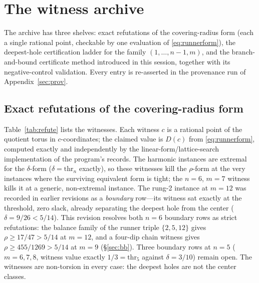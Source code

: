 
\section{The witness archive}\label{sec:witness}

The archive has three shelves: exact refutations of the covering-radius
form (each a single rational point, checkable by one evaluation of
\eqref{eq:runnerform}), the deepest-hole certification ladder for the
family $(1,\dots,n{-}1,m)$, and the branch-and-bound certificate method
introduced in this session, together with its negative-control
validation. Every entry is re-asserted in the provenance run of
Appendix~\ref{sec:prov}.

\subsection{Exact refutations of the covering-radius form}

Table~\ref{tab:refute} lists the witnesses. Each witness $c$ is a
rational point of the quotient torus in $c$-coordinates; the claimed
value is $D(c)$ from \eqref{eq:runnerform}, computed exactly and
independently by the linear-form/lattice-search implementation of the
program's records. The harmonic instances are extremal for the
$\delta$-form ($\delta=\mathrm{thr}_n$ exactly), so these witnesses kill
the $\rho$-form at the very instances where the surviving equivalent form
is tight; the $n=6$, $m=7$ witness kills it at a generic, non-extremal
instance. The rung-2 instance at $m=12$ was recorded in earlier revisions as a
\emph{boundary} row---its witness sat exactly at the threshold, zero
slack, already separating the deepest hole from the center
($\delta=9/26<5/14$). This revision resolves both $n=6$ boundary rows
as strict refutations: the balance family of the runner triple
$\{2,5,12\}$ gives $\rho\ge17/47>5/14$ at $m=12$, and a four-dip
chain witness gives $\rho\ge455/1269>5/14$ at $m=9$
(\S\ref{sec:bb}). Three boundary rows at $n=5$ ($m=6,7,8$, witness
value exactly $1/3=\mathrm{thr}_5$ against $\delta=3/10$) remain open.
The witnesses are non-torsion in every case: the deepest holes are not
the center classes.

